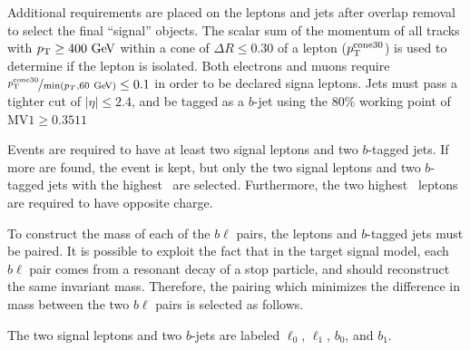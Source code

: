 Additional requirements are placed on the leptons and jets after overlap
removal to select the final ``signal'' objects.
The scalar sum of the momentum of all tracks with $\pt \geq 400 \GeV$
within a cone of $\Delta R \leq 0.30$ of a lepton ($p_{\mathrm{T}}^\mathrm{cone30}$) is
used to determine if the lepton is isolated.
Both electrons and muons require
$\nicefrac{\pT^{\mathrm{cone30}}}{\min(p_T, 60 \GeV)} \leq 0.1$ in order
to be declared signa leptons.
Jets must pass a tighter cut of $|\eta| \leq 2.4$, and be tagged as a $b$-jet
using the 80\% working point of $\mathrm{MV1} \geq 0.3511$

Events are required to have at least two signal leptons and two $b$-tagged jets.
If more are found, the event is kept, but only the two signal leptons and two
$b$-tagged jets with the highest \pt\ are selected.
Furthermore, the two highest \pt\ leptons are required to have opposite charge.

To construct the mass of each of the $b\ell$ pairs, the leptons and $b$-tagged
jets must be paired.
It is possible to exploit the fact that in the target signal model, each
$b\ell$ pair comes from a resonant decay of a stop particle, and should
reconstruct the same invariant mass.
Therefore, the pairing which minimizes the difference in mass between the two
$b\ell$ pairs is selected as follows.

The two signal leptons and two $b$-jets are labeled $\ell_0$, $\ell_1$, $b_0$,
and $b_1$.


